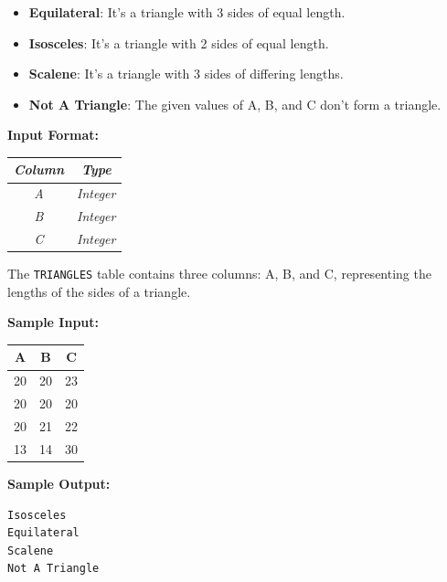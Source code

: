 \documentclass[12pt,a4paper]{article}
\renewcommand{\arraystretch}{1.5} %
\begin{document}
\begin{itemize}
    \item \textbf{Equilateral}: It's a triangle with 3 sides of equal length.
    \item \textbf{Isosceles}: It's a triangle with 2 sides of equal length.
    \item \textbf{Scalene}: It's a triangle with 3 sides of differing lengths.
    \item \textbf{Not A Triangle}: The given values of A, B, and C don't form a triangle.
\end{itemize}
\textbf{Input Format:}
\begin{table}[H]
\renewcommand{\arraystretch}{1.3}
\begin{tabular}{|c|c|}
\hline
\textit{Column} & \textit{Type} \\ \hline
\textit{A} & \textit{Integer} \\ \hline
\textit{B} & \textit{Integer} \\ \hline
\textit{C} & \textit{Integer} \\ \hline
\end{tabular}
\end{table}
The \texttt{TRIANGLES} table contains three columns: A, B, and C, representing the lengths of the sides of a triangle.
\newline
\noindent
\begin{minipage}[t]{0.48\textwidth}
\textbf{Sample Input:}
\vspace{0.3em}
\begin{tabular}{|c|c|c|}
\hline
A & B & C \\ \hline
20 & 20 & 23 \\ \hline
20 & 20 & 20 \\ \hline
20 & 21 & 22 \\ \hline
13 & 14 & 30 \\ \hline
\end{tabular}
\end{minipage}
\hfill
\begin{minipage}[t]{0.48\textwidth}
\textbf{Sample Output:}
\vspace{0.3em}
\begin{verbatim}
Isosceles
Equilateral
Scalene
Not A Triangle
\end{verbatim}
\end{minipage}
\end{document}

